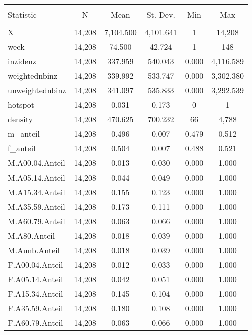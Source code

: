 \documentclass{article}
\begin{document}
\begin{table}[!htbp] \centering 
  \caption{} 
  \label{} 
\begin{tabular}{@{\extracolsep{5pt}}lccccc} 
\\[-1.8ex]\hline 
\hline \\[-1.8ex] 
Statistic & \multicolumn{1}{c}{N} & \multicolumn{1}{c}{Mean} & \multicolumn{1}{c}{St. Dev.} & \multicolumn{1}{c}{Min} & \multicolumn{1}{c}{Max} \\ 
\hline \\[-1.8ex] 
X & 14,208 & 7,104.500 & 4,101.641 & 1 & 14,208 \\ 
week & 14,208 & 74.500 & 42.724 & 1 & 148 \\ 
inzidenz & 14,208 & 337.959 & 540.043 & 0.000 & 4,116.589 \\ 
weightednbinz & 14,208 & 339.992 & 533.747 & 0.000 & 3,302.380 \\ 
unweightednbinz & 14,208 & 341.097 & 535.833 & 0.000 & 3,292.539 \\ 
hotspot & 14,208 & 0.031 & 0.173 & 0 & 1 \\ 
density & 14,208 & 470.625 & 700.232 & 66 & 4,788 \\ 
m\_anteil & 14,208 & 0.496 & 0.007 & 0.479 & 0.512 \\ 
f\_anteil & 14,208 & 0.504 & 0.007 & 0.488 & 0.521 \\ 
M.A00.04.Anteil & 14,208 & 0.013 & 0.030 & 0.000 & 1.000 \\ 
M.A05.14.Anteil & 14,208 & 0.044 & 0.049 & 0.000 & 1.000 \\ 
M.A15.34.Anteil & 14,208 & 0.155 & 0.123 & 0.000 & 1.000 \\ 
M.A35.59.Anteil & 14,208 & 0.173 & 0.111 & 0.000 & 1.000 \\ 
M.A60.79.Anteil & 14,208 & 0.063 & 0.066 & 0.000 & 1.000 \\ 
M.A80.Anteil & 14,208 & 0.018 & 0.039 & 0.000 & 1.000 \\ 
M.Aunb.Anteil & 14,208 & 0.018 & 0.039 & 0.000 & 1.000 \\ 
F.A00.04.Anteil & 14,208 & 0.012 & 0.033 & 0.000 & 1.000 \\ 
F.A05.14.Anteil & 14,208 & 0.042 & 0.051 & 0.000 & 1.000 \\ 
F.A15.34.Anteil & 14,208 & 0.145 & 0.104 & 0.000 & 1.000 \\ 
F.A35.59.Anteil & 14,208 & 0.180 & 0.108 & 0.000 & 1.000 \\ 
F.A60.79.Anteil & 14,208 & 0.063 & 0.066 & 0.000 & 1.000 \\ 

\end{tabular}
\end{table}
\end{document}
